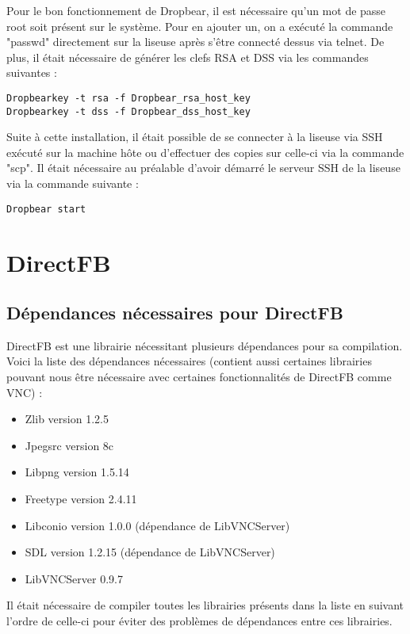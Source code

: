 Pour le bon fonctionnement de Dropbear, il est nécessaire qu'un mot de passe root soit présent sur le système. Pour en ajouter un, on a exécuté la commande "passwd" directement sur la liseuse après s'être connecté dessus via telnet.
De plus, il était nécessaire de générer les clefs RSA et DSS via les commandes suivantes :

\begin{lstlisting}
Dropbearkey -t rsa -f Dropbear_rsa_host_key
Dropbearkey -t dss -f Dropbear_dss_host_key
\end{lstlisting}

Suite à cette installation, il était possible de se connecter à la liseuse via SSH exécuté sur la machine hôte ou d'effectuer des copies sur celle-ci via la commande "scp". Il était nécessaire au préalable d'avoir démarré le serveur SSH de la liseuse via la commande suivante :

\begin{lstlisting}
Dropbear start
\end{lstlisting}

\newpage


\section{DirectFB}

\subsection{Dépendances nécessaires pour DirectFB}

DirectFB est une librairie nécessitant plusieurs dépendances pour sa compilation. Voici la liste des dépendances nécessaires (contient aussi certaines librairies pouvant nous être nécessaire avec certaines fonctionnalités de DirectFB comme VNC) :

\begin{itemize}
\item Zlib version 1.2.5
\item Jpegsrc version 8c
\item Libpng version 1.5.14
\item Freetype version 2.4.11
\item Libconio version 1.0.0 (dépendance de LibVNCServer)
\item SDL version 1.2.15 (dépendance de LibVNCServer)
\item LibVNCServer 0.9.7
\end{itemize}

Il était nécessaire de compiler toutes les librairies présents dans la liste en suivant l'ordre de celle-ci pour éviter des problèmes de dépendances entre ces librairies.

